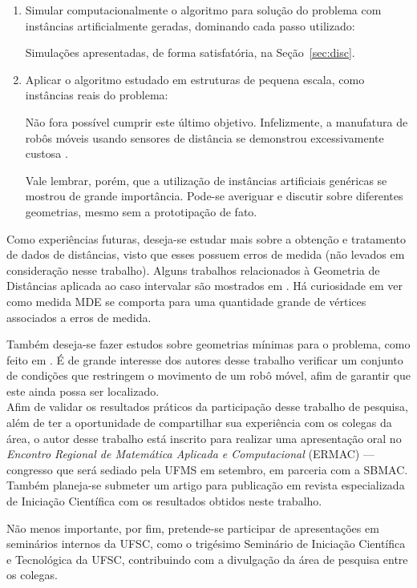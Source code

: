 \documentclass[a4paper,12pt]{report}
\begin{document}
\begin{enumerate}
		\item Simular computacionalmente o algoritmo para solução do problema com instâncias artificialmente geradas, dominando cada passo utilizado:
		
		Simulações apresentadas, de forma satisfatória, na Seção~\ref{sec:disc}.
		
		\item Aplicar o algoritmo estudado em estruturas de pequena escala, como instâncias reais do problema:
		
		Não fora possível cumprir este último objetivo. Infelizmente, a manufatura de robôs móveis usando sensores de distância se demonstrou excessivamente custosa \cite{savvides2001dynamic}.
		
		Vale lembrar, porém, que a utilização de instâncias artificiais genéricas se mostrou de grande importância. Pode-se averiguar e discutir sobre diferentes geometrias, mesmo sem a prototipação de fato.
		
	\end{enumerate} 
	
	Como experiências futuras, deseja-se estudar mais sobre a obtenção e tratamento de dados de distâncias, visto que esses possuem erros de medida \cite{sensorsForMobileRobots} (não levados em consideração nesse trabalho). Alguns trabalhos relacionados à Geometria de Distâncias aplicada ao caso intervalar são mostrados em \cite{wsnlSemidefinitePrograming}. Há curiosidade em ver como medida MDE se comporta para uma quantidade grande de vértices associados a erros de medida.
	
	Também deseja-se fazer estudos sobre geometrias mínimas para o problema, como feito em \cite{wsnlFewAnchors}. É de grande interesse dos autores desse trabalho verificar um conjunto de condições que restringem o movimento de um robô móvel, afim de garantir que este ainda possa ser localizado.
	\\
	
	Afim de validar os resultados práticos da participação desse trabalho de pesquisa, além de ter a oportunidade de compartilhar sua experiência com os colegas da área, o autor desse trabalho está inscrito para realizar uma apresentação oral no \textit{Encontro Regional de Matemática Aplicada e Computacional} (ERMAC) --- congresso que será sediado pela UFMS em setembro, em parceria com a SBMAC. Também planeja-se submeter um artigo para publicação em revista especializada de Iniciação Científica com os resultados obtidos neste trabalho.

	Não menos importante, por fim, pretende-se participar de apresentações em seminários internos da UFSC, como o trigésimo Seminário de Iniciação Científica e Tecnológica da UFSC, contribuindo com a divulgação da área de pesquisa entre os colegas.

	\newpage
	\label{sec:ref}
	
	
	
	
	\newpage
	\appendix
	
\end{document}

